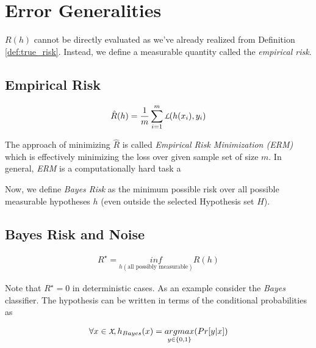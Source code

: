 \documentclass[../toml]{subfiles}
\begin{document}
\section{Error Generalities}

$R(h)$ cannot be directly evaluated as we've already realized from Definition
\ref{def:true_risk}. Instead, we define a measurable quantity called the \textit{empirical
risk}.

\subsection{Empirical Risk}

\begin{definition} \label{def:emp_risk}
\begin{align}
\hat{R}(h) = \frac{1}{m} \sum_{i=1}^{m} \cursive{L}(h(x_i),y_i)
\end{align}
\end{definition}

The approach of minimizing $\hat{R}$ is called \textit{Empirical Risk Minimization (ERM)}
which is effectively minimizing the loss over given sample set of size $m$. In general,
\textit{ERM} is a computationally hard task a

Now, we define \textit{Bayes Risk} as the minimum possible risk over all possible
measurable hypotheses $h$ (even outside the selected Hypothesis set $H$).

\subsection{Bayes Risk and Noise}

\begin{definition} \label{def:bayes_risk}
\begin{align}
R^\star = \underset{h (\text{all possibly measurable})}{inf} R(h)
\end{align}
\end{definition}

Note that $R^\star = 0$ in deterministic cases. As an example consider the \textit{Bayes}
classifier. The hypothesis can be written in terms of the conditional probabilities as

\begin{definition} \label{def:bayes_hypothesis}
\begin{align}
\forall x \in \cursive{X}, h_{Bayes}(x) = \underset{y\in\{0,1\}}{argmax} (Pr[y|x])
\end{align}
\end{definition}
\end{document}
